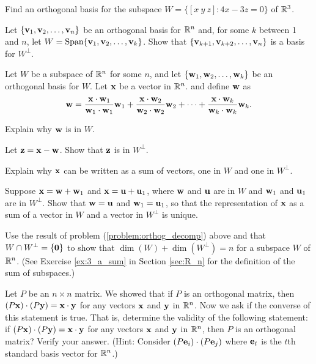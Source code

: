 \be
\item Find an orthogonal basis for the subspace $W = \{ [x \ y \ z] : 4x-3z = 0\}$ of $\mathbb{R}^3$.

\item Let $\{\mathbf{v}_1, \mathbf{v}_2, \ldots, \mathbf{v}_n\}$ be an orthogonal basis for $\mathbb{R}^n$ and, for some $k$ between 1 and $n$, let $W = \text{Span}\{\mathbf{v}_1,\mathbf{v}_2, \ldots, \mathbf{v}_k\}$. Show that $\{\mathbf{v}_{k+1}, \mathbf{v}_{k+2}, \ldots, \mathbf{v}_n\}$ is a basis for $W^{\perp}$. 

\item \label{problem:orthog_decomp} Let $W$ be a subspace of $\mathbb{R}^n$ for some $n$, and let $\{\mathbf{w}_1, \mathbf{w}_2, \ldots, \mathbf{w}_k\}$ be an orthogonal basis for $W$. Let $\mathbf{x}$ be a vector in $\mathbb{R}^n$. and define $\mathbf{w}$ as 
\[\mathbf{w} = \frac{\mathbf{x} \cdot \mathbf{w}_1}{\mathbf{w}_1 \cdot \mathbf{w}_1} \mathbf{w}_1 + \frac{\mathbf{x} \cdot \mathbf{w}_2}{\mathbf{w}_2 \cdot \mathbf{w}_2} \mathbf{w}_2 + \cdots + \frac{\mathbf{x} \cdot \mathbf{w}_k}{\mathbf{w}_k \cdot \mathbf{w}_k} \mathbf{w}_k.\]
	\ba
	\item Explain why $\mathbf{w}$ is in $W$.
	\item Let $\mathbf{z} = \mathbf{x} - \mathbf{w}$. Show that $\mathbf{z}$ is in $W^{\perp}$. 

	\item Explain why $\mathbf{x}$ can be written as a sum of vectors, one in $W$ and one in $W^{\perp}$. 

	\item Suppose $\mathbf{x} = \mathbf{w}+\mathbf{w}_1$ and $\mathbf{x} = \mathbf{u}+\mathbf{u}_1$, where $\mathbf{w}$ and $\mathbf{u}$ are in $W$ and $\mathbf{w}_1$ and $\mathbf{u}_1$ are in $W^{\perp}$. Show that $\mathbf{w}=\mathbf{u}$ and $\mathbf{w}_1 = \mathbf{u}_1$, so that the representation of $\mathbf{x}$ as a sum of a vector in $W$ and a vector in $W^{\perp}$ is unique.

	\ea

\item Use the result of problem (\ref{problem:orthog_decomp}) above and that $W\cap W^\perp=\{\mathbf{0}\}$ to show that $\dim(W)+\dim(W^\perp)=n$ for a subspace $W$ of $\mathbb{R}^n$. (See Exercise \ref{ex:3_a_sum} in Section \ref{sec:R_n} for the definition of the sum of subspaces.)


\item Let $P$ be an $n \times n$ matrix. We showed that if $P$ is an orthogonal matrix, then $(P\mathbf{x}) \cdot (P\mathbf{y}) = \mathbf{x} \cdot \mathbf{y}$ for any vectors $\mathbf{x}$ and $\mathbf{y}$ in $\mathbb{R}^n$. Now we ask if the converse of this statement is true. That is, determine the validity of the following statement: if $(P\mathbf{x}) \cdot (P\mathbf{y}) = \mathbf{x} \cdot \mathbf{y}$ for any vectors $\mathbf{x}$ and $\mathbf{y}$ in $\mathbb{R}^n$, then $P$ is an orthogonal matrix? Verify your answer. (Hint: Consider $(P \mathbf{e}_i) \cdot (P \mathbf{e}_j)$ where $\mathbf{e}_t$ is the $t$th standard basis vector for $\mathbb{R}^n$.) 

